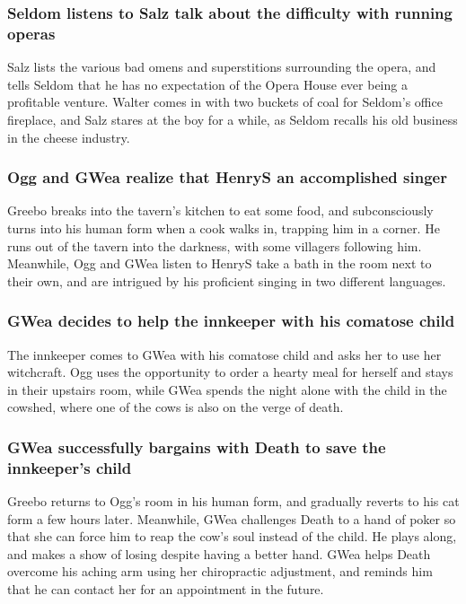 \subsubsection{\Gls{Seldom} listens to \Gls{Salz} talk about the difficulty with running operas}
\Gls{Salz} lists the various bad omens and superstitions surrounding the opera, and tells
\Gls{Seldom} that he has no expectation of the Opera House ever being a profitable venture.
\Gls{Walter} comes in with two buckets of coal for \Gls{Seldom}'s office fireplace, and \Gls{Salz}
stares at the boy for a while, as \Gls{Seldom} recalls his old business in the cheese industry.

\subsubsection{\Gls{Ogg} and \Gls{GWea} realize that \Gls{HenryS} an accomplished singer}
\Gls{Greebo} breaks into the tavern's kitchen to eat some food, and subconsciously turns into his
human form when a cook walks in, trapping him in a corner. He runs out of the tavern into the
darkness, with some villagers following him. Meanwhile, \Gls{Ogg} and \Gls{GWea} listen to
\Gls{HenryS} take a bath in the room next to their own, and are intrigued by his proficient singing
in two different languages.

\subsubsection{\Gls{GWea} decides to help the innkeeper with his comatose child}
The innkeeper comes to \Gls{GWea} with his comatose child and asks her to use her witchcraft.
\Gls{Ogg} uses the opportunity to order a hearty meal for herself and stays in their upstairs room,
while \Gls{GWea} spends the night alone with the child in the cowshed, where one of the cows is
also on the verge of death.

\subsubsection{\Gls{GWea} successfully bargains with \Gls{Death} to save the innkeeper's child}
\Gls{Greebo} returns to \Gls{Ogg}'s room in his human form, and gradually reverts to his cat form
a few hours later. Meanwhile, \Gls{GWea} challenges \Gls{Death} to a hand of poker so that she can
force him to reap the cow's soul instead of the child. He plays along, and makes a show of losing
despite having a better hand. \Gls{GWea} helps \Gls{Death} overcome his aching arm using her
chiropractic adjustment, and reminds him that he can contact her for an appointment in the future.

